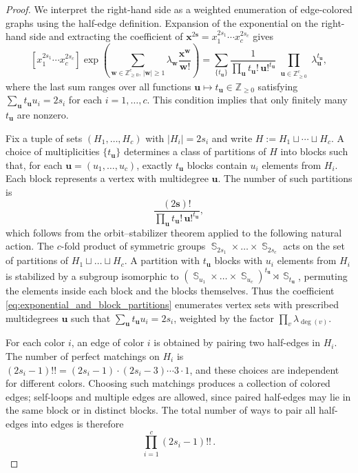\documentclass[10pt,a4paper]{amsart}
\DeclareMathOperator{\Sym}{\mathbb{S}}
\newcommand{\Z}{\mathbb{Z}}
\newcommand{\bb}[1]{\boldsymbol{#1}}
\begin{document}
\begin{proof}
We interpret the right-hand side as a weighted enumeration of edge-colored graphs using the half-edge definition. Expansion of the exponential on the right-hand side and extracting the coefficient of $\bb x^{2\bb s}=x_1^{2s_1}\cdots x_c^{2s_c}$ gives
\begin{equation}\label{eq:exponential_and_block_partitions}
    [x_1^{2s_1}\cdots x_c^{2s_c}]
    \exp\left( \sum_{\bb{w}\in \Z^c_{\geq 0},\, |\bb{w}| \geq 1} \lambda_{\bb{w}} \frac{\bb{x}^{\bb{w}}}{\bb{w}!} \right)
    = 
    \sum_{\{t_{\bb{u}}\}} 
    \frac{1}{\prod_{\bb{u}} t_{\bb{u}}!\, \bb{u}!^{t_{\bb{u}}}} \prod_{\substack{\bb{u}\in \Z^c_{\geq 0}}} \lambda_{\bb{u}}^{t_{\bb{u}}},
\end{equation}
where the last sum ranges over all functions
$\bb u\mapsto t_{\bb u}\in\Z_{\ge0}$ satisfying
$\sum_{\bb u}t_{\bb u}u_i=2s_i$ for each $i=1,\dots,c$.
This condition implies that only finitely many $t_{\bb u}$ are nonzero.

Fix a tuple of sets $(H_1,\ldots,H_c)$ with $|H_i|=2s_i$ and write $H:=H_1\sqcup\cdots\sqcup H_c$.
A choice of multiplicities $\{t_{\bb u}\}$ determines a class of partitions of $H$ into blocks such that, for each $\bb u=(u_1,\dots,u_c)$, exactly $t_{\bb u}$ blocks
contain $u_i$ elements from $H_i$.
Each block represents a vertex with multidegree $\bb u$.
The number of such partitions is
\begin{equation}\label{eq:block_partitions}
\frac{(2\bb s)!}{\prod_{\bb u}t_{\bb u}!\,\bb u!^{t_{\bb u}}},
\end{equation}
which follows from the orbit--stabilizer theorem applied to the following natural action. The $c$-fold product of symmetric groups $\Sym_{2s_1} \times \dots \times \Sym_{2s_c}$ acts  on the set of partitions of $H_1 \sqcup \dots \sqcup H_c$. A partition with $t_{\bb{u}}$ blocks with $u_i$ elements from $H_i$ is stabilized by a subgroup isomorphic to $(\Sym_{u_1} \times \dots \times \Sym_{u_c})^{t_{\bb{u}}} \rtimes \Sym_{t_{\bb{u}}}$, permuting the elements inside each block and the blocks themselves.
Thus the coefficient \eqref{eq:exponential_and_block_partitions} enumerates vertex sets with
prescribed multidegrees $\bb u$ such that $\sum_{\bb u}t_{\bb u}u_i=2s_i$, weighted by the factor
$\prod_v\lambda_{\deg(v)}$.

For each color $i$, an edge of color $i$ is obtained by pairing two half-edges in
$H_i$.
The number of perfect matchings on $H_i$ is $(2s_i-1)!!=(2s_i-1) \cdot (2s_i-3) \cdots 3 \cdot 1$, and these choices are
independent for different colors.
Choosing such matchings produces a collection of colored edges; self-loops and
multiple edges are allowed, since paired half-edges may lie in the same block or in
distinct blocks.
The total number of ways to pair all half-edges into edges is therefore
\[
\prod_{i=1}^c(2s_i-1)!! \, .
\]


\end{proof}
\end{document}
